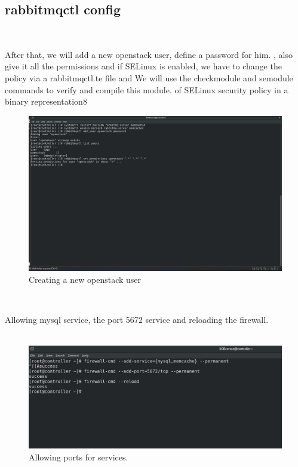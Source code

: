 \begin{spacing}{1.2}
\section{rabbitmqctl config }
\\
\par After that, we will add a new openstack user, define a password for him.
, also give it all the permissions and if SELinux is enabled, we have to change the policy
via a rabbitmqctl.te file and We will use the checkmodule and semodule commands to verify and compile this module.
of SELinux security policy in a binary representation8 
\\
\begin{figure}[!htb] 
\begin{center} 
\includegraphics[width=1\linewidth]{Cloud/Pre-Requirements/Creating a new openstack user} 
\end{center} 
\caption{Creating a new openstack user} 
\end{figure}  \FloatBarrier
\\


\par Allowing mysql service, the port 5672 service and reloading the firewall.\\
\\
\begin{figure}[!htb] 
\begin{center} 
\includegraphics[width=.8\linewidth]{Cloud/Pre-Requirements/Allowing ports for services.} 
\end{center} 
\caption{Allowing ports for services.} 
\end{figure}  \FloatBarrier
\\


\end{spacing}